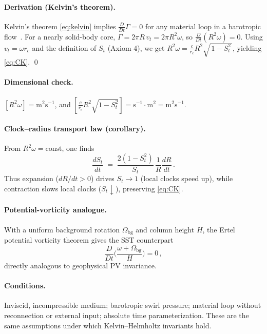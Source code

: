 \documentclass[11pt]{article}
\begin{document}
\paragraph{Derivation (Kelvin's theorem).}
    Kelvin's theorem \ref{eq:kelvin}  implies $\frac{D}{Dt}\Gamma=0$ for any material loop in a barotropic flow~\cite{Helmholtz1858,Kelvin1869,Batchelor1967}. For a nearly solid-body core, $\Gamma = 2\pi R\, v_t = 2\pi R^2 \omega$, so $\frac{D}{Dt}(R^2 \omega)=0$. Using $v_t = \omega r_c$ and the definition of $S_t$ (Axiom 4), we get $R^2\omega=\frac{c}{r_c}R^2\sqrt{\,1-S_t^2\,}$, yielding \eqref{eq:CK}. \qed

\paragraph{Dimensional check.}
    $[R^2\omega] = \mathrm{m}^2\mathrm{s}^{-1}$, and $[\frac{c}{r_c}R^2\sqrt{1-S_t^2}] = \mathrm{s}^{-1}\cdot \mathrm{m}^2 = \mathrm{m}^2\mathrm{s}^{-1}$.

\paragraph{Clock–radius transport law (corollary).}
    From $R^2\omega=\mathrm{const}$, one finds
    \begin{equation}
        \frac{dS_t}{dt} \;=\; \frac{2(1-S_t^2)}{S_t}\,\frac{1}{R}\frac{dR}{dt}\,.
        \label{eq:clock-radius-ode}
    \end{equation}
    Thus expansion ($dR/dt>0$) drives $S_t\to 1$ (local clocks speed up), while contraction slows local clocks ($S_t\downarrow$), preserving \eqref{eq:CK}.

\paragraph{Potential-vorticity analogue.}
    With a uniform background rotation $\Omega_{\text{bg}}$ and column height $H$, the Ertel potential vorticity theorem gives the SST counterpart~\cite{Ertel1942,Batchelor1967}
    \begin{equation}
        \frac{D}{Dt}\Big(\frac{\omega + \Omega_{\text{bg}}}{H}\Big)=0\,,
        \label{eq:PV-analogue}
    \end{equation}
    directly analogous to geophysical PV invariance.

\paragraph{Conditions.}
    Inviscid, incompressible medium; barotropic swirl pressure; material loop without reconnection or external input; absolute time parameterization. These are the same assumptions under which Kelvin–Helmholtz invariants hold.
\end{document}
